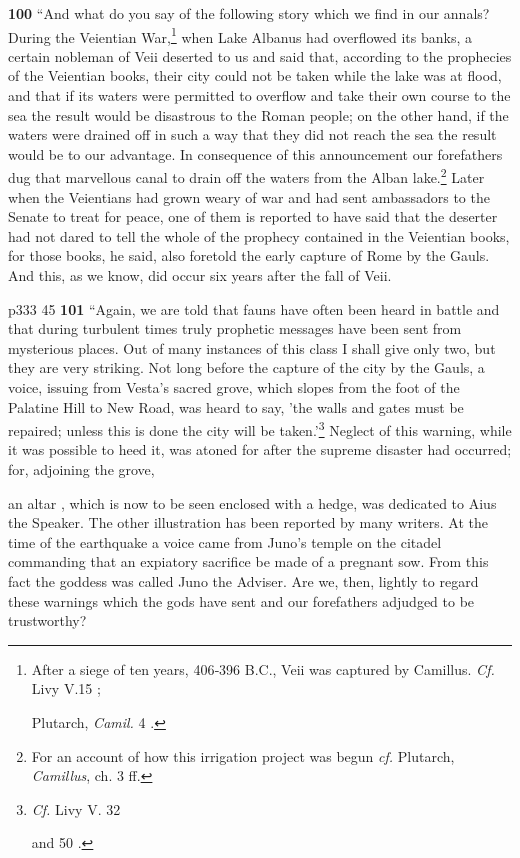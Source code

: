 \textbf{100} ``And what do you say of the following story which we find in our annals? During the Veientian War,\texthebrew{}\footnote{After a siege of ten years, 406\texthebrew{‑}396 B.C., Veii was captured by Camillus. \emph{Cf.} Livy V.15 ;

Plutarch, \emph{Camil.} 4 .

} when Lake Albanus had overflowed its banks, a certain nobleman of Veii deserted to us and said that, according to the prophecies of the Veientian books, their city could not be taken while the lake was at flood, and that if its waters were permitted to overflow and take their own course to the sea the result would be disastrous to the Roman people; on the other hand, if the waters were drained off in such a way that they did not reach the sea the result would be to our advantage. In consequence of this announcement our forefathers dug that marvellous canal to drain off the waters from the Alban lake.\texthebrew{}\footnote{For an account of how this irrigation project was begun \emph{cf.} Plutarch, \emph{Camillus}, ch. 3 ff.

} Later when the Veientians had grown weary of war and had sent ambassadors to the Senate to treat for peace, one of them is reported to have said that the deserter had not dared to tell the whole of the prophecy contained in the Veientian books, for those books, he said, also foretold the early capture of Rome by the Gauls. And this, as we know, did occur six years after the fall of Veii.

p333
45
\textbf{101} ``Again, we are told that fauns have often been heard in battle and that during turbulent times truly prophetic messages have been sent from mysterious places. Out of many instances of this class I shall give only two, but they are very striking. Not long before the capture of the city by the Gauls, a voice, issuing from Vesta's sacred grove, which slopes from the foot of the Palatine Hill to New Road, was heard to say, 'the walls and gates must be repaired; unless this is done the city will be taken.'\texthebrew{}\footnote{\emph{Cf.} Livy V. 32

and 50 .

} Neglect of this warning, while it was possible to heed it, was atoned for after the supreme disaster had occurred; for, adjoining the grove,

an altar , which is now to be seen enclosed with a hedge, was dedicated to Aius the Speaker. The other illustration has been reported by many writers. At the time of the earthquake a voice came from Juno's temple on the citadel commanding that an expiatory sacrifice be made of a pregnant sow. From this fact the goddess was called Juno the Adviser. Are we, then, lightly to regard these warnings which the gods have sent and our forefathers adjudged to be trustworthy?

